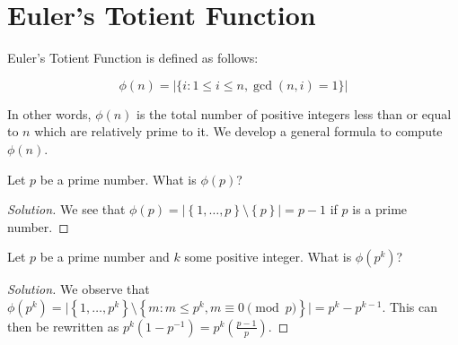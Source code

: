 \documentclass{article}
\newenvironment{solution}{\begin{proof}[Solution]}{\end{proof}}
\begin{document}
\newpage

\section{Euler's Totient Function}
Euler's Totient Function is defined as follows:

\begin{equation*}
	\phi(n) = |\{i: 1 \leq i \leq n, \gcd(n,i)=1\}|
\end{equation*}

In other words, $\phi(n)$ is the total number of positive integers less than or equal to $n$ which are relatively prime to it. We develop a general formula to compute $\phi(n)$.

\begin{hw}
	Let $p$ be a prime number. What is $\phi(p)$?
\end{hw}
\begin{solution}
	We see that $\phi(p) = \lvert \left\{  1, \ldots, p \right\}\setminus\left\{  p\right\} \rvert = p-1$ if $p$ is a prime number.
\end{solution}

\begin{hw}
	Let $p$ be a prime number and $k$ some positive integer. What is $\phi(p^{k})$?
\end{hw}
\begin{solution}
	We observe that $\phi(p^{k}) = \lvert \left\{ 1, \ldots, p^{k} \right\}\setminus\left\{m : m \leq p^{k}, m \equiv 0 \pmod{p}\right\} \rvert = p^{k} - p^{k-1}$. This can then be rewritten as $p^{k}(1 - p^{-1}) = p^{k}(\frac{p - 1}{p})$.
\end{solution}
\end{document}
